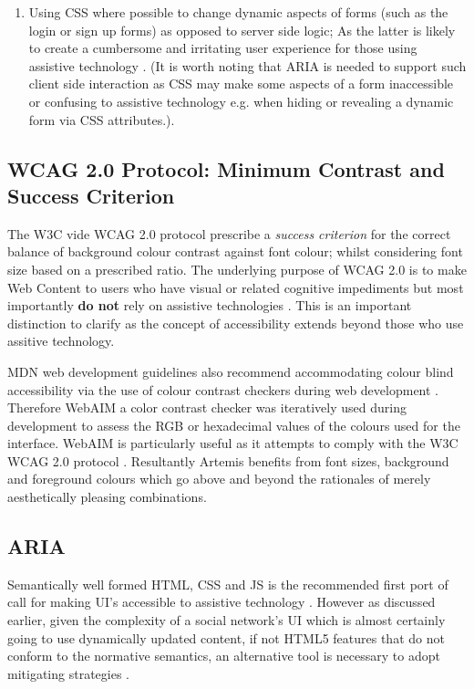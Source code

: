 \begin{enumerate}
\begin{enumerate}
        \item Using CSS where possible to change dynamic aspects of forms (such as the login or sign up forms) as opposed to server side logic; As the latter is likely to create a cumbersome and irritating user experience for those using assistive technology \cite{Mills}. (It is worth noting that ARIA is needed to support such client side interaction as CSS may make some aspects of a form inaccessible or confusing to assistive technology e.g. when hiding or revealing a dynamic form via CSS attributes.).
        
    \end{enumerate}
\end{enumerate}

    

\subsection{WCAG 2.0 Protocol: Minimum Contrast and Success Criterion}

    
    The W3C vide WCAG 2.0 protocol \cite{W3Ca,W3Cb} prescribe a \textit{success criterion} for the correct balance of background colour contrast against font colour; whilst considering font size based on a prescribed ratio. The underlying purpose of WCAG 2.0 is to make Web Content to users who have visual or related cognitive impediments but most importantly \textbf{do not} rely on assistive technologies \cite{W3Ca,W3Cb}. This is an important distinction to clarify as the concept of accessibility extends beyond those who use assitive technology.
    
    MDN web development guidelines also recommend accommodating  colour blind accessibility via the use of colour contrast checkers during web development \cite{Mills}. Therefore WebAIM a color contrast checker was iteratively used during development to assess the RGB or hexadecimal values of the colours used for the interface. WebAIM is particularly useful as it attempts to comply with the W3C WCAG 2.0 protocol \cite{WebAIM,W3Ca,W3Cb}. Resultantly Artemis benefits from font sizes, background and foreground colours which go above and beyond the rationales of merely aesthetically pleasing combinations.
    

\subsection{ARIA}

Semantically well formed HTML, CSS and JS is the recommended first port of call for making UI's accessible to assistive technology \cite{Sukardi2016}. However as discussed earlier, given the complexity of a social network's UI which is almost certainly going to use  dynamically updated content, if not HTML5 features that do not conform to the normative semantics, an alternative tool is necessary to adopt mitigating strategies \cite{Sukardi2016}.

